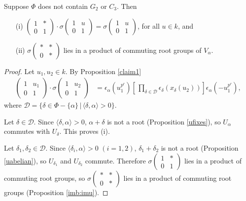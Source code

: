 \begin{lemma}\label{lem:first} Suppose $\Phi$ does not contain $G_2$ or $C_3$. Then
\begin{itemize}
\item[(i)] $\left(\begin{matrix} 1 & * \\ 0 & 1\end{matrix}\right) \cdot \sigma\left(\begin{matrix} 1 & u \\ 0 & 1\end{matrix}\right) = \sigma\left(\begin{matrix} 1 & u \\ 0 & 1\end{matrix}\right)$, for all $u\in k$, and
\item[(ii)] $\sigma\left(\begin{matrix} * & * \\ 0 & *\end{matrix}\right)$ lies in a product of commuting root groups of $V_\alpha$.
\end{itemize}
\end{lemma}
\begin{proof}
Let $u_1,u_2 \in k$. By Proposition \ref{claim1}
\begin{align*}
\left(\begin{matrix}1 & u_1 \\ 0 & 1 \end{matrix}\right)
\cdot
\sigma\left(\begin{matrix} 1 & u_2 \\ 0 & 1\end{matrix}\right)
&=
\epsilon_\alpha(u_1^{p^r}) \left[\,\prod_{\delta\in\mathcal{D}} \epsilon_\delta\left(x_\delta\left(u_2\right)\right)\right] \epsilon_\alpha(-u_1^{p^r}),
\end{align*}
where $\mathcal{D}=\{\delta \in \Phi -\{\alpha\} \,|\,\langle \delta, \alpha \rangle > 0\}$.

Let $\delta \in \mathcal{D}$. Since $\langle \delta, \alpha \rangle > 0$, $\alpha + \delta$ is not a root (Proposition \ref{ufixes}), so $U_\alpha$ commutes with $U_\delta$. This proves (i).

Let $\delta_1, \delta_2 \in \mathcal{D}$. Since $\langle \delta_i, \alpha \rangle > 0$ $(i=1,2)$, $\delta_1 + \delta_2$ is not a root (Proposition \ref{uabelian}), so $U_{\delta_1}$ and $U_{\delta_2}$ commute. Therefore $\sigma\left(\begin{matrix}1 & * \\ 0 & 1\end{matrix}\right)$ lies in a product of commuting root groups, so $\sigma\left(\begin{matrix}* & *\\0 & *\end{matrix}\right)$ lies in a product of commuting root groups (Proposition \ref{imb:imu}).
\end{proof}

